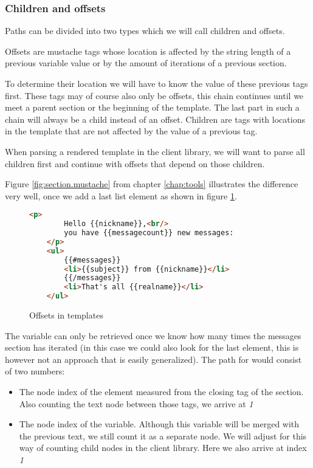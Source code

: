 \subsubsection{Children and offsets}
Paths can be divided into two types which we will call children and offsets.

Offsets are mustache tags whose location is affected by the string length of a
previous variable value or by the amount of iterations of a previous section.

To determine their location we will have to know the value of these previous
tags first. These tags may of course also only be offsets, this chain continues
until we meet a parent section or the beginning of the template.
The last part in such a chain will always be a child instead of an offset.
Children are tags with locations in the template that are not affected by
the value of a previous tag.

When parsing a rendered template in the client library, we will want to parse
all children first and continue with offsets that depend on those children.

Figure \ref{fig:section.mustache} from chapter \ref{chap:tools}
illustrates the difference very well, once we add a last list element as
shown in figure \ref{fig:offsets.mustache}.

\begin{figure}
	\centering
	\caption{Offsets in templates}
	\label{fig:offsets.mustache}
	\begin{lstlisting}[language=HTML]
	<p>
		Hello {{nickname}},<br/>
		you have {{messagecount}} new messages:
	</p>
	<ul>
		{{#messages}}
		<li>{{subject}} from {{nickname}}</li>
		{{/messages}}
		<li>That's all {{realname}}</li>
	</ul>
	\end{lstlisting}
\end{figure}

The  variable can only be retrieved once we know how
many times the messages section has iterated (in this case we could also look
for the last  element, this is however not an approach that is
easily generalized). The path for  would consist of
two numbers:
\begin{itemize}
\item The node index of the  element measured from
      the closing tag of the  section.
      Also counting the text node between those tags, we arrive at \emph{1}
\item The node index of the  variable. Although this
      variable will be merged with the previous text, we still count it as a
      separate node. We will adjust for this way of counting child nodes in
      the client library. Here we also arrive at index \emph{1}
\end{itemize}

